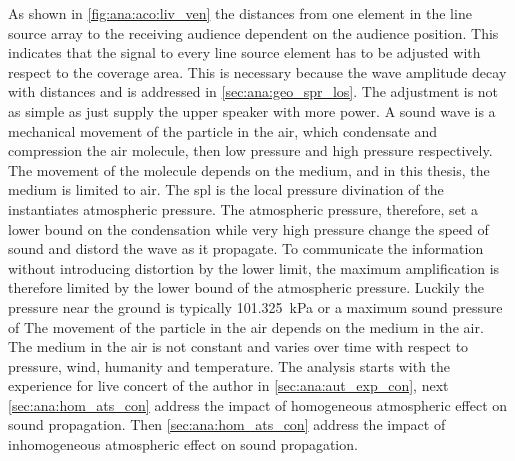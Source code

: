 
As shown in \autoref{fig:ana:aco:liv_ven} the distances from one element in the line source array to the receiving audience dependent on the audience position. This indicates that the signal to every line source element has to be adjusted with respect to the coverage area. This is necessary because the wave amplitude decay with distances and is addressed in \autoref{sec:ana:geo_spr_los}. The adjustment is not as simple as just supply the upper speaker with more power. A sound wave is a mechanical movement of the particle in the air, which condensate and compression the air molecule, then low pressure and high pressure respectively. The movement of the molecule depends on the medium, and in this thesis, the medium is limited to air. The \gls{spl} is the local pressure divination of the instantiates atmospheric pressure. The atmospheric pressure, therefore, set a lower bound on the condensation while very high pressure change the speed of sound and distord the wave as it propagate. To communicate the information without introducing distortion by the lower limit, the maximum amplification is therefore limited by the lower bound of the atmospheric pressure. Luckily the pressure near the ground is typically \SI{101.325}{\kilo\pascal} or a maximum sound pressure of  The movement of the particle in the air depends on the medium in the air. The medium in the air is not constant and varies over time with respect to pressure, wind, humanity and temperature. The analysis starts with the experience for live concert of the author in \autoref{sec:ana:aut_exp_con}, next \autoref{sec:ana:hom_ats_con} address the impact of homogeneous atmospheric effect on sound propagation. Then \autoref{sec:ana:hom_ats_con} address the impact of  inhomogeneous atmospheric effect on sound propagation. 


